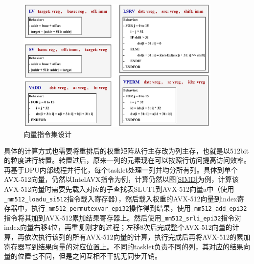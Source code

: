 \begin{figure}[!htbp]
	\centering
    \includegraphics[width=0.9\textwidth]{figures/SIMDInst.pdf}
	\caption{向量指令集设计}
    \label{SIMDInst}
\end{figure}

具体的计算方式也需要将重排后的权重矩阵从行主存改为列主存，也就是以512bit的粒度进行转置。转置过后，原来一列的元素现在可以按照行访问提高访问效率。再基于DPU内部线程并行化，每个tasklet处理一列并均分所有列。具体到单个AVX-512向量，仍然以IntelAVX指令为例，计算仍然以图\ref{SIMD}为例，计算该AVX-512向量时需要先载入对应的子查找表SLUT1到AVX-512向量a中（使用\verb|_mm512_loadu_si512|指令载入寄存器），然后载入权重的AVX-512向量到index寄存器中，执行\verb|_mm512_permutexvar_epi32|操作得到结果，使用\verb|_mm512_add_epi32|指令将其加到AVX-512累加结果寄存器上。然后使用\verb|_mm512_srli_epi32|指令对index向量右移4位，再重复刚才的过程；左移8次后完成整个AVX-512向量的计算，再依次执行该列的所有AVX-512向量的计算，执行完成后再将AVX-512的累加寄存器写到结果向量的对应位置上。不同的tasklet负责不同的列，其对应的结果向量的位置也不同，但是之间互相不干扰无同步开销。

